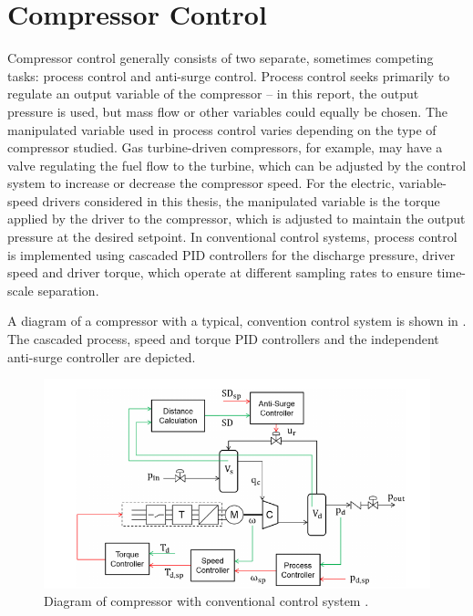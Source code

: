 \section{Compressor Control}
\label{sec:intro:compressor}

Compressor control generally consists of two separate, sometimes competing tasks: process control and anti-surge control.
Process control seeks primarily to regulate an output variable of the compressor -- in this report, the output pressure is used, but mass flow or other variables could equally be chosen.
The manipulated variable used in process control varies depending on the type of compressor studied.
Gas turbine-driven compressors, for example, may have a valve regulating the fuel flow to the turbine, which can be adjusted by the control system to increase or decrease the compressor speed. 
For the electric, variable-speed drivers considered in this thesis, the manipulated variable is the torque applied by the driver to the compressor, which is adjusted to maintain the output pressure at the desired setpoint.
In conventional control systems, process control is implemented using cascaded PID controllers for the discharge pressure, driver speed and driver torque, which operate at different sampling rates to ensure time-scale separation.

A diagram of a compressor with a typical, convention control system is shown in .
The cascaded process, speed and torque PID controllers and the independent anti-surge controller are depicted.

\begin{figure}
  \centering
  \includegraphics[width=\linewidth]{intro/diagram.png}
  \caption{Diagram of compressor with conventional control system \cite{Cortinovis2015}.}
  \label{fig:intro:compressor:diagram}
\end{figure}


